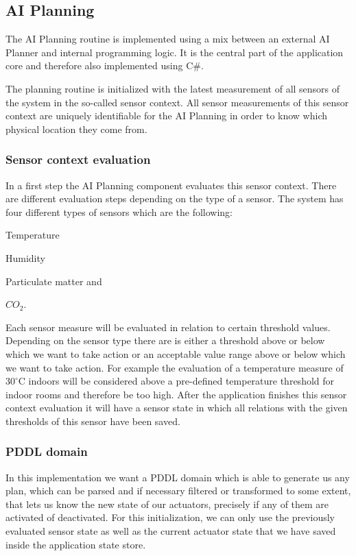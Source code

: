 \subsection{AI Planning}\label{subsec:ai-planning}
The AI Planning routine is implemented using a mix between an external AI Planner and internal programming logic.
It is the central part of the application core and therefore also implemented using C\#.

The planning routine is initialized with the latest measurement of all sensors of the system in the so-called sensor context.
All sensor measurements of this sensor context are uniquely identifiable for the AI Planning in order to know which physical location they come from.

\subsubsection{Sensor context evaluation}\label{subsubsec:sensor-context-evaluation}
In a first step the AI Planning component evaluates this sensor context.
There are different evaluation steps depending on the type of a sensor.
The system has four different types of sensors which are the following:
\begin{inparaenum}[1)]
    \item Temperature
    \item Humidity
    \item Particulate matter and
    \item $CO_2$.
\end{inparaenum}

Each sensor measure will be evaluated in relation to certain threshold values.
Depending on the sensor type there are is either a threshold above or below which we want to take action or an acceptable value range above or below which we want to take action.
For example the evaluation of a temperature measure of $30^\circ$C indoors will be considered above a pre-defined temperature threshold for indoor rooms and therefore be too high.
After the application finishes this sensor context evaluation it will have a sensor state in which all relations with the given thresholds of this sensor have been saved.

\subsubsection{PDDL domain}\label{subsubsec:pddl-domain}
In this implementation we want a PDDL domain which is able to generate us any plan, which can be parsed and if necessary filtered or transformed to some extent, that lets us know the new state of our actuators, precisely if any of them are activated of deactivated.
For this initialization, we can only use the previously evaluated sensor state as well as the current actuator state that we have saved inside the application state store.

